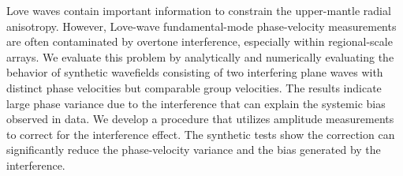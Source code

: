 Love waves contain important information to constrain the upper-mantle radial anisotropy. However, Love-wave fundamental-mode phase-velocity measurements are often contaminated by overtone interference, especially within regional-scale arrays.
We evaluate this problem by analytically and numerically evaluating the behavior of synthetic wavefields consisting of two interfering plane waves with distinct phase velocities but comparable group velocities.
The results indicate large phase variance due to the interference that can explain the systemic bias observed in data. 
We develop a procedure that utilizes amplitude measurements to correct for the interference effect. The synthetic tests show the correction can significantly reduce the phase-velocity variance and the bias generated by the interference.

\raggedbottom
\pagebreak

\frontmatter

\pagestyle{fancy}
\chead{}
\lhead{}
\rhead{}
\cfoot{\thepage}
\renewcommand{\headrulewidth}{0pt}

\tableofcontents
{}
\raggedbottom
\pagebreak

\listoffigures
{}
\raggedbottom
\pagebreak

\listoftables
{}
\raggedbottom
\pagebreak

